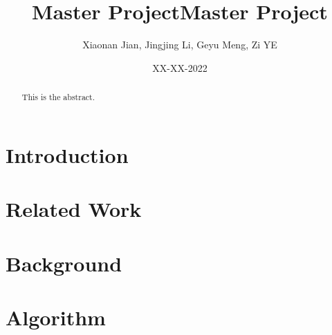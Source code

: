 \documentclass[]{article}
\title{Master Project}
\begin{document}
\title {Master Project}
\author{Xiaonan Jian, Jingjing Li, Geyu Meng, Zi YE}
\date{XX-XX-2022}
\maketitle
\thispagestyle{empty}

\newpage
\begin{abstract}
 This is the abstract.  
\end{abstract}
\thispagestyle{empty}
\newpage
{}
\tableofcontents

\newpage
{}
\section{Introduction}


\newpage
\section{Related Work}

\newpage
\section{Background}

\section{Algorithm}
\end{document}
